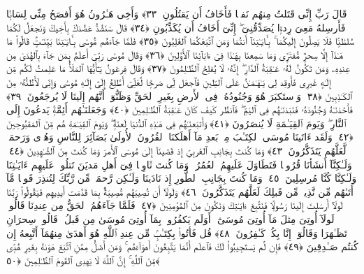  قَالَ رَبِّ إِنِّى قَتَلتُ مِنهُم نَفسًۭا فَأَخَافُ أَن يَقتُلُونِ ﴿٣٣﴾
 وَأَخِى هَـٰرُونُ هُوَ أَفصَحُ مِنِّى لِسَانًۭا فَأَرسِلهُ مَعِىَ رِدءًۭا يُصَدِّقُنِىٓ ۖ إِنِّىٓ أَخَافُ أَن يُكَذِّبُونِ ﴿٣٤﴾
 قَالَ سَنَشُدُّ عَضُدَكَ بِأَخِيكَ وَنَجعَلُ لَكُمَا سُلطَٰنًۭا فَلَا يَصِلُونَ إِلَيكُمَا ۚ بِـَٔايَـٰتِنَآ أَنتُمَا وَمَنِ ٱتَّبَعَكُمَا ٱلغَٰلِبُونَ ﴿٣٥﴾
 فَلَمَّا جَآءَهُم مُّوسَىٰ بِـَٔايَـٰتِنَا بَيِّنَـٰتٍۢ قَالُوا۟ مَا هَـٰذَآ إِلَّا سِحرٌۭ مُّفتَرًۭى وَمَا سَمِعنَا بِهَـٰذَا فِىٓ ءَابَآئِنَا ٱلأَوَّلِينَ ﴿٣٦﴾
 وَقَالَ مُوسَىٰ رَبِّىٓ أَعلَمُ بِمَن جَآءَ بِٱلهُدَىٰ مِن عِندِهِۦ وَمَن تَكُونُ لَهُۥ عَـٰقِبَةُ ٱلدَّارِ ۖ إِنَّهُۥ لَا يُفلِحُ ٱلظَّـٰلِمُونَ ﴿٣٧﴾
 وَقَالَ فِرعَونُ يَـٰٓأَيُّهَا ٱلمَلَأُ مَا عَلِمتُ لَكُم مِّن إِلَـٰهٍ غَيرِى فَأَوقِد لِى يَـٰهَـٰمَـٰنُ عَلَى ٱلطِّينِ فَٱجعَل لِّى صَرحًۭا لَّعَلِّىٓ أَطَّلِعُ إِلَىٰٓ إِلَـٰهِ مُوسَىٰ وَإِنِّى لَأَظُنُّهُۥ مِنَ ٱلكَـٰذِبِينَ ﴿٣٨﴾
 وَٱستَكبَرَ هُوَ وَجُنُودُهُۥ فِى ٱلأَرضِ بِغَيرِ ٱلحَقِّ وَظَنُّوٓا۟ أَنَّهُم إِلَينَا لَا يُرجَعُونَ ﴿٣٩﴾
 فَأَخَذنَـٰهُ وَجُنُودَهُۥ فَنَبَذنَـٰهُم فِى ٱليَمِّ ۖ فَٱنظُر كَيفَ كَانَ عَـٰقِبَةُ ٱلظَّـٰلِمِينَ ﴿٤٠﴾
 وَجَعَلنَـٰهُم أَئِمَّةًۭ يَدعُونَ إِلَى ٱلنَّارِ ۖ وَيَومَ ٱلقِيَـٰمَةِ لَا يُنصَرُونَ ﴿٤١﴾
 وَأَتبَعنَـٰهُم فِى هَـٰذِهِ ٱلدُّنيَا لَعنَةًۭ ۖ وَيَومَ ٱلقِيَـٰمَةِ هُم مِّنَ ٱلمَقبُوحِينَ ﴿٤٢﴾
 وَلَقَد ءَاتَينَا مُوسَى ٱلكِتَـٰبَ مِنۢ بَعدِ مَآ أَهلَكنَا ٱلقُرُونَ ٱلأُولَىٰ بَصَآئِرَ لِلنَّاسِ وَهُدًۭى وَرَحمَةًۭ لَّعَلَّهُم يَتَذَكَّرُونَ ﴿٤٣﴾
 وَمَا كُنتَ بِجَانِبِ ٱلغَربِىِّ إِذ قَضَينَآ إِلَىٰ مُوسَى ٱلأَمرَ وَمَا كُنتَ مِنَ ٱلشَّـٰهِدِينَ ﴿٤٤﴾
 وَلَـٰكِنَّآ أَنشَأنَا قُرُونًۭا فَتَطَاوَلَ عَلَيهِمُ ٱلعُمُرُ ۚ وَمَا كُنتَ ثَاوِيًۭا فِىٓ أَهلِ مَديَنَ تَتلُوا۟ عَلَيهِم ءَايَـٰتِنَا وَلَـٰكِنَّا كُنَّا مُرسِلِينَ ﴿٤٥﴾
 وَمَا كُنتَ بِجَانِبِ ٱلطُّورِ إِذ نَادَينَا وَلَـٰكِن رَّحمَةًۭ مِّن رَّبِّكَ لِتُنذِرَ قَومًۭا مَّآ أَتَىٰهُم مِّن نَّذِيرٍۢ مِّن قَبلِكَ لَعَلَّهُم يَتَذَكَّرُونَ ﴿٤٦﴾
 وَلَولَآ أَن تُصِيبَهُم مُّصِيبَةٌۢ بِمَا قَدَّمَت أَيدِيهِم فَيَقُولُوا۟ رَبَّنَا لَولَآ أَرسَلتَ إِلَينَا رَسُولًۭا فَنَتَّبِعَ ءَايَـٰتِكَ وَنَكُونَ مِنَ ٱلمُؤمِنِينَ ﴿٤٧﴾
 فَلَمَّا جَآءَهُمُ ٱلحَقُّ مِن عِندِنَا قَالُوا۟ لَولَآ أُوتِىَ مِثلَ مَآ أُوتِىَ مُوسَىٰٓ ۚ أَوَلَم يَكفُرُوا۟ بِمَآ أُوتِىَ مُوسَىٰ مِن قَبلُ ۖ قَالُوا۟ سِحرَانِ تَظَـٰهَرَا وَقَالُوٓا۟ إِنَّا بِكُلٍّۢ كَـٰفِرُونَ ﴿٤٨﴾
 قُل فَأتُوا۟ بِكِتَـٰبٍۢ مِّن عِندِ ٱللَّهِ هُوَ أَهدَىٰ مِنهُمَآ أَتَّبِعهُ إِن كُنتُم صَـٰدِقِينَ ﴿٤٩﴾
 فَإِن لَّم يَستَجِيبُوا۟ لَكَ فَٱعلَم أَنَّمَا يَتَّبِعُونَ أَهوَآءَهُم ۚ وَمَن أَضَلُّ مِمَّنِ ٱتَّبَعَ هَوَىٰهُ بِغَيرِ هُدًۭى مِّنَ ٱللَّهِ ۚ إِنَّ ٱللَّهَ لَا يَهدِى ٱلقَومَ ٱلظَّـٰلِمِينَ ﴿٥٠﴾
